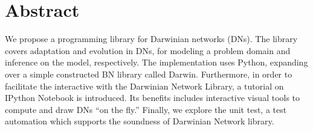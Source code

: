 %
\chapter*{Abstract}
\label{sec:abstract}
\vspace*{-10mm}

We propose a programming library for Darwinian networks (DNs).
The library covers adaptation and evolution in DNs, for modeling a problem domain and inference on the model, respectively.
The implementation uses Python, expanding over a simple constructed BN library called Darwin.
Furthermore, in order to facilitate the interactive with the Darwinian Network Library, a tutorial on IPython Notebook is introduced.
Its benefits includes interactive visual tools to compute and draw DNs ``on the fly.''
Finally, we explore the unit test, a test automation which supports the soundness of Darwinian Network library.
